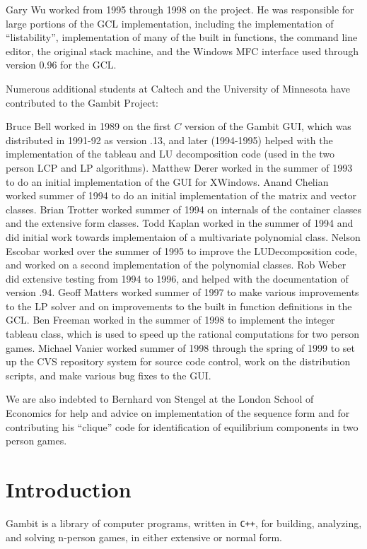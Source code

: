 \documentclass[12pt]{report}
\begin{document}
Gary Wu worked from 1995 through 1998 on the project.  He was
responsible for large portions of the GCL implementation, including
the implementation of ``listability'', implementation of many of the
built in functions, the command line editor, the original stack
machine, and the Windows MFC interface used through version 0.96 for the GCL.

Numerous additional students at Caltech and the University of Minnesota
have contributed to the Gambit Project:

Bruce Bell worked in 1989 on the first $C$ version of the Gambit GUI,
which was distributed in 1991-92 as version .13, and later (1994-1995)
helped with the implementation of the tableau and LU decomposition
code (used in the two person LCP and LP algorithms). Matthew Derer
worked in the summer of 1993 to do an initial implementation of the
GUI for XWindows.  Anand Chelian worked summer of 1994 to do an
initial implementation of the matrix and vector classes.  Brian
Trotter worked summer of 1994 on internals of the container classes
and the extensive form classes.  Todd Kaplan worked in the summer of
1994 and did initial work towards implementaion of a multivariate
polynomial class.  Nelson Escobar worked over the summer of 1995 to
improve the LUDecomposition code, and worked on a second
implementation of the polynomial classes.  Rob Weber did extensive
testing from 1994 to 1996, and helped with the documentation of
version .94.  Geoff Matters worked summer of 1997 to make various
improvements to the LP solver and on improvements to the built in
function definitions in the GCL.  Ben Freeman worked in the summer of
1998 to implement the integer tableau class, which is used to speed up
the rational computations for two person games.  Michael Vanier worked
summer of 1998 through the spring of 1999 to set up the CVS repository
system for source code control, work on the distribution scripts, and
make various bug fixes to the GUI.

We are also indebted to Bernhard von Stengel at the London School of
Economics for help and advice on implementation of the sequence form
and for contributing his ``clique'' code for identification of
equilibrium components in two person games.

\chapter{Introduction}

Gambit is a library of computer programs, written
in \verb$C++$, for building, analyzing, and solving n-person games, in
either extensive or normal form.
\end{document}
